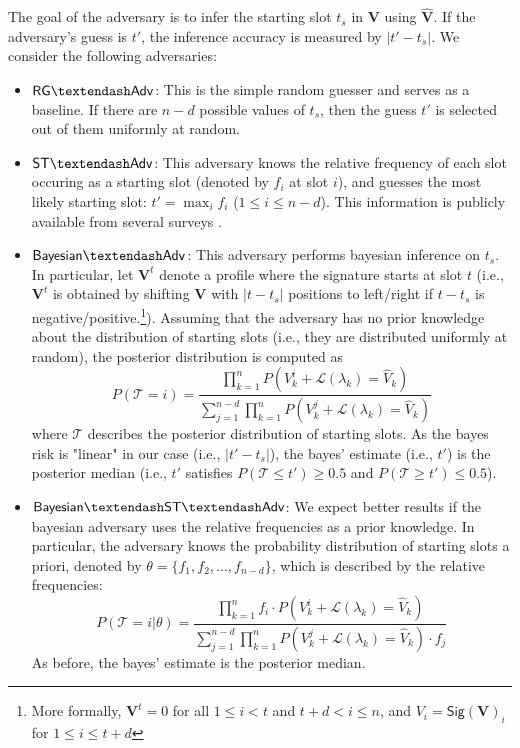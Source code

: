 \documentclass[11pt,a4paper]{article}
\theoremstyle{plain}
\theoremstyle{plain}
\theoremstyle{plain}
\theoremstyle{plain}
\theoremstyle{nonumberplain} \theoremseparator{}
\newcommand{\sig}{\ensuremath{\mathsf{Sig}}\xspace}
\newcommand{\rndadv}{\ensuremath{\mathsf{RG\textendash Adv}}\xspace}
\newcommand{\statadv}{\ensuremath{\mathsf{ST\textendash Adv}}\xspace}
\newcommand{\bstatadv}{\ensuremath{\mathsf{Bayesian\textendash ST\textendash Adv}}\xspace}
\newcommand{\badv}{\ensuremath{\mathsf{Bayesian\textendash Adv}}\xspace}
\begin{document}
The goal of the adversary is to infer the starting slot $t_{s}$ in $\mathbf{V}$ using $\hat{\mathbf{V}}$.
If the adversary's guess is $t'$, the inference accuracy is measured by $|t'-t_{s}|$.
We consider the following adversaries:
\begin{itemize}
\item \rndadv: This is the simple random guesser and serves as a baseline. If there are $n-d$ possible values of $t_{s}$, then the guess $t'$ is selected out of them uniformly at random.
\item \statadv: This adversary knows the relative frequency of each slot occuring as a starting slot (denoted by $f_i$ at slot $i$), and guesses the most likely starting slot: $t' = \max_i f_i$ ($1 \leq i \leq n-d$). This information is publicly available from several surveys \cite{richardson10}.  
\item \badv: This adversary performs bayesian inference on $t_s$. 
In particular, let $\mathbf{V}^t$ denote a profile where the signature starts at slot $t$ (i.e., $\mathbf{V}^t$ is obtained by shifting $\mathbf{V}$ with $|t-t_s|$ positions to left/right if $t-t_s$ is negative/positive.\footnote{More formally, $\mathbf{V}^t=0$ for all $1 \leq i < t$ and $t+d < i \leq n$, and $V_i = \sig(\mathbf{V})_i$ for $1 \leq i \leq t+d$}). Assuming that 
the adversary has no prior knowledge about the distribution of starting slots (i.e., they are distributed uniformly at random), the posterior distribution is
computed as 
$$
P(\mathcal{T} = i) =  \frac{\prod_{k=1}^{n}  P(V^i_k + \mathcal{L}(\lambda_k) = \hat{V}_k)}{\sum_{j=1}^{n-d} \prod_{k=1}^{n}P(V^j_k + \mathcal{L}(\lambda_k) = \hat{V}_k)}
$$
where $\mathcal{T}$ describes the posterior distribution of starting slots.
As the bayes risk is "linear" in our case (i.e., $|t'-t_s|$), the bayes' estimate (i.e., $t'$) is the
posterior median (i.e., $t'$ satisfies $P(\mathcal{T} \leq t') \geq 0.5$ and $P(\mathcal{T} \geq t') \leq 0.5$).

\item \bstatadv: We expect better results if the bayesian adversary uses the relative frequencies as a prior
knowledge. In particular, the adversary knows the probability distribution of starting slots a priori, denoted by $\theta = \{f_1, f_2, \ldots, f_{n-d}\}$, which is described by the relative frequencies:
$$
P(\mathcal{T} = i|\theta) = \frac{ \prod_{k=1}^{n} f_i \cdot P(V^i_k + \mathcal{L}(\lambda_k) = \hat{V}_k)}{\sum_{j=1}^{n-d} \prod_{k=1}^{n}P(V^j_k + \mathcal{L}(\lambda_k) = \hat{V}_k)\cdot f_j} 
$$
As before, the bayes' estimate is the posterior median.
\end{itemize}
\end{document}

